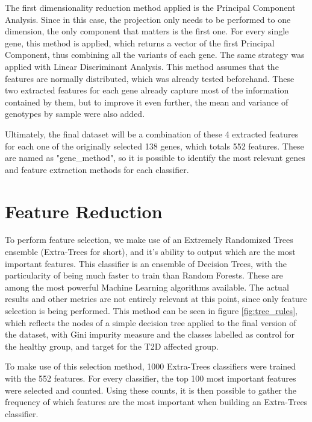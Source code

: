 The first dimensionality reduction method applied is the Principal Component Analysis. Since in this case, the projection only needs to be performed to one dimension, the only component that matters is the first one. For every single gene, this method is applied, which returns a vector of the first Principal Component, thus combining all the variants of each gene. The same strategy was applied with Linear Discriminant Analysis. This method assumes that the features are normally distributed, which was already tested beforehand. These two extracted features for each gene already capture most of the information contained by them, but to improve it even further, the mean and variance of genotypes by sample were also added.

Ultimately, the final dataset will be a combination of these 4 extracted features for each one of the originally selected 138 genes, which totals 552 features. These are named as "gene\_method", so it is possible to identify the most relevant
genes and feature extraction methods for each classifier.


\section{Feature Reduction} \label{s:fr}

To perform feature selection, we make use of an Extremely Randomized Trees ensemble (Extra-Trees for short), and it's ability to output which are the most important features. This classifier is an ensemble of Decision Trees, with the particularity of being much faster to train than Random Forests. These are among the most powerful Machine Learning algorithms available. The actual results and other metrics are not entirely relevant at this point, since only feature selection is being performed. This method can be seen in figure \ref{fig:tree_rules}, which reflects the nodes of a simple decision tree applied to the final version of the dataset, with Gini impurity measure and the classes labelled as control for the healthy group, and target for the \gls{T2D} affected group.

To make use of this selection method, 1000 Extra-Trees classifiers were trained with the 552 features. For every classifier, the top 100 most important features were selected and counted. Using these counts, it is then possible to gather the frequency of which features are the most important when building an Extra-Trees classifier.


